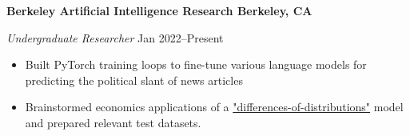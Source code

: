 \textbf{Berkeley Artificial Intelligence Research \hfill Berkeley, CA}\par
\textit{Undergraduate Researcher} \hfill Jan 2022--Present\par
\begin{itemize}
	\item Built PyTorch training loops to fine-tune various language models for predicting the political slant of news articles
	\item Brainstormed economics applications of a \href{https://arxiv.org/abs/2201.12323}{"differences-of-distributions"} model and prepared relevant test datasets.
\end{itemize} \par